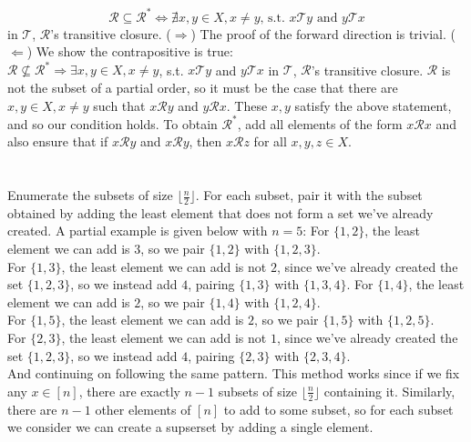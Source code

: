 \documentclass{article}
\begin{document}
\section{} %
\[\mathcal{R}\subseteq\mathcal{R}^*\iff\nexists x,y\in X,x\neq y\text{, s.t. }x\mathcal{T}y\text{ and }y\mathcal{T}x\]
in $\mathcal{T}$, $\mathcal{R}$'s transitive closure.
\newline
($\Longrightarrow$)
\newline
The proof of the forward direction is trivial.
\newline
($\Longleftarrow$)
\newline
We show the contrapositive is true:\\
$\mathcal{R}\nsubseteq\mathcal{R}^*\Longrightarrow\exists x,y\in X,x\neq y$, s.t.
$x\mathcal{T}y$ and $y\mathcal{T}x$ in $\mathcal{T}$, $\mathcal{R}$'s transitive
closure.
\newline
\newline
$\mathcal{R}$ is not the subset of a partial order, so it must be the case that
there are $x,y\in X, x\neq y$ such that $x\mathcal{R}y$ and $y\mathcal{R}x$.
These $x,y$ satisfy the above statement, and so our condition holds.
\newline
\newline
To obtain $\mathcal{R}^*$, add all elements of the form $x\mathcal{R}x$ and also
ensure that if $x\mathcal{R}y$ and $x\mathcal{R}y$, then $x\mathcal{R}z$ for all
$x,y,z\in X$.
\section{} %
Enumerate the subsets of size $\big\lfloor\frac{n}{2}\big\rfloor$. For each
subset, pair it with the subset obtained by adding the least element that does
not form a set we've already created. A partial example is given below with $n=5$:
\newline
\newline
For $\{1,2\}$, the least element we can add is $3$, so we pair $\{1,2\}$ with
$\{1,2,3\}$.\\
For $\{1,3\}$, the least element we can add is not $2$, since we've already
created the set $\{1,2,3\}$, so we instead add $4$, pairing $\{1,3\}$ with
$\{1,3,4\}$.
For $\{1,4\}$, the least element we can add is $2$, so we pair $\{1,4\}$ with
$\{1,2,4\}$.\\
For $\{1,5\}$, the least element we can add is $2$, so we pair $\{1,5\}$ with
$\{1,2,5\}$.\\
For $\{2,3\}$, the least element we can add is not $1$, since we've already
created the set $\{1,2,3\}$, so we instead add $4$, pairing $\{2,3\}$ with
$\{2,3,4\}$.\\
And continuing on following the same pattern.
\newline
\newline
This method works since if we fix any $x\in[n]$, there are exactly $n-1$
subsets of size $\big\lfloor\frac{n}{2}\big\rfloor$ containing it. Similarly,
there are $n-1$ other elements of $[n]$ to add to some subset, so for each
subset we consider we can create a supserset by adding a single element.
\end{document}
